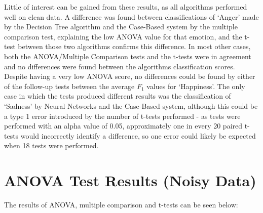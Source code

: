 \documentclass[a4paper]{article}
\begin{document}
 Little of interest can be gained from these results, as all algorithms performed well on clean data. A difference was found
 between classifications of `Anger' made by the Decision Tree algorithm and the Case-Based system by the multiple comparison
 test, explaining the low ANOVA value for that emotion, and the t-test between those two algorithms confirms this difference.
 In most other cases, both the ANOVA/Multiple Comparison tests and the t-tests were in agreement and no differences were found
 between the algorithms classification scores. Despite having a very low ANOVA score, no differences could be found by either
 of the follow-up tests between the average $F_1$ values for `Happiness'. The only case in which the tests produced different
 results was the classification of `Sadness' by Neural Networks and the Case-Based system, although this could be a type 1 error
 introduced by the number of t-tests performed - as tests were performed with an alpha value of 0.05, approximately one in every
 20 paired t-tests would incorrectly identify a difference, so one error could likely be expected when 18 tests were performed.\\
  
\newpage
\section{ANOVA Test Results (Noisy Data)}

The results of ANOVA, multiple comparison and t-tests can be seen below:
\end{document}
